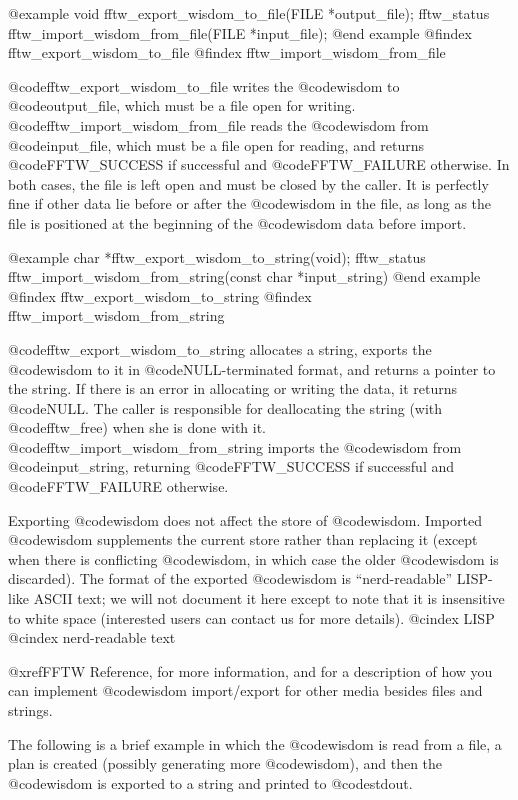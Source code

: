 @example
void fftw_export_wisdom_to_file(FILE *output_file);
fftw_status fftw_import_wisdom_from_file(FILE *input_file);
@end example
@findex fftw_export_wisdom_to_file
@findex fftw_import_wisdom_from_file

@code{fftw_export_wisdom_to_file} writes the @code{wisdom} to
@code{output_file}, which must be a file open for
writing. @code{fftw_import_wisdom_from_file} reads the @code{wisdom}
from @code{input_file}, which must be a file open for reading, and
returns @code{FFTW_SUCCESS} if successful and @code{FFTW_FAILURE}
otherwise. In both cases, the file is left open and must be closed by
the caller.  It is perfectly fine if other data lie before or after the
@code{wisdom} in the file, as long as the file is positioned at the
beginning of the @code{wisdom} data before import.

@example
char *fftw_export_wisdom_to_string(void);
fftw_status fftw_import_wisdom_from_string(const char *input_string)
@end example
@findex fftw_export_wisdom_to_string
@findex fftw_import_wisdom_from_string

@code{fftw_export_wisdom_to_string} allocates a string, exports the
@code{wisdom} to it in @code{NULL}-terminated format, and returns a
pointer to the string.  If there is an error in allocating or writing
the data, it returns @code{NULL}.  The caller is responsible for
deallocating the string (with @code{fftw_free}) when she is done with
it. @code{fftw_import_wisdom_from_string} imports the @code{wisdom} from
@code{input_string}, returning @code{FFTW_SUCCESS} if successful and
@code{FFTW_FAILURE} otherwise.

Exporting @code{wisdom} does not affect the store of @code{wisdom}. Imported
@code{wisdom} supplements the current store rather than replacing it
(except when there is conflicting @code{wisdom}, in which case the older
@code{wisdom} is discarded). The format of the exported @code{wisdom} is
``nerd-readable'' LISP-like ASCII text; we will not document it here
except to note that it is insensitive to white space (interested users
can contact us for more details).
@cindex LISP
@cindex nerd-readable text

@xref{FFTW Reference}, for more information, and for a description of
how you can implement @code{wisdom} import/export for other media
besides files and strings.

The following is a brief example in which the @code{wisdom} is read from
a file, a plan is created (possibly generating more @code{wisdom}), and
then the @code{wisdom} is exported to a string and printed to
@code{stdout}.

